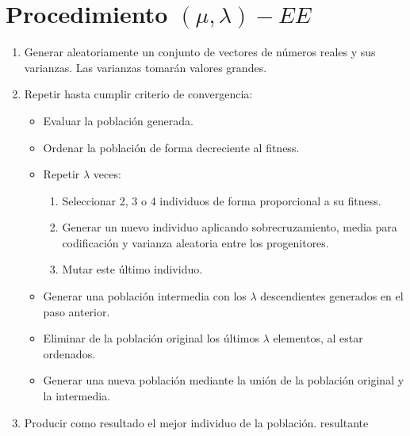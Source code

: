 \documentclass[12pt, twoside, openright]{report} %
\begin{document}
\section{Procedimiento $(\mu, \lambda)-EE$}
\begin{enumerate}
	\item Generar aleatoriamente un conjunto de vectores de números reales y sus varianzas. Las varianzas tomarán valores grandes.
	\item Repetir hasta cumplir criterio de convergencia:
	\begin{itemize}
		\item Evaluar la población generada.
		\item Ordenar la población de forma decreciente al fitness.
		\item Repetir $\lambda$ veces:
		\begin{enumerate}
			\item Seleccionar 2, 3 o 4 individuos de forma proporcional a su fitness.
			\item Generar un nuevo individuo aplicando sobrecruzamiento, media para codificación y varianza aleatoria entre los progenitores.
			\item Mutar este último individuo.
		\end{enumerate}
		\item Generar una población intermedia con los $\lambda$ descendientes generados en el paso anterior.
		\item Eliminar de la población original los últimos $\lambda$ elementos, al estar ordenados.
		\item Generar una nueva población mediante la unión de la población original y la intermedia.
	\end{itemize}
	\item Producir como resultado el mejor individuo de la población.
	resultante
\end{enumerate}
\end{document}

